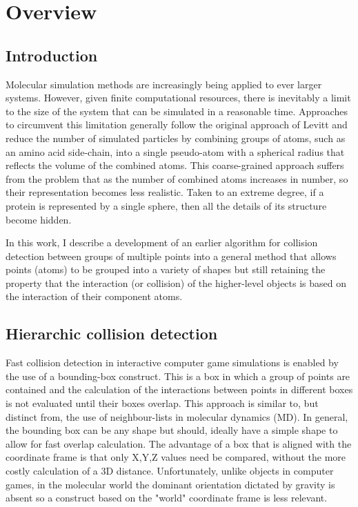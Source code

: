 \section{Overview}

\subsection{Introduction}

Molecular simulation methods are increasingly being applied to ever larger systems.
However, given finite computational resources, there is inevitably a limit to the
size of the system that can be simulated in a reasonable time.   Approaches to 
circumvent this limitation generally follow the original approach of Levitt and
reduce the number of simulated particles by combining groups of atoms, such as an
amino acid side-chain, into a single pseudo-atom with a spherical radius that
reflects the volume of the combined atoms.
This coarse-grained approach suffers from the problem that as the number of combined
atoms increases in number, so their representation becomes less realistic.  Taken
to an extreme degree, if a protein is represented by a single sphere, then all 
the details of its structure become hidden.  

In this work, I describe a development of an earlier algorithm for collision 
detection between groups of multiple points into a general method that allows
points (atoms) to be grouped into a variety of shapes but still retaining the 
property that the interaction (or collision) of the higher-level objects is based
on the interaction of their component atoms.

\subsection{Hierarchic collision detection}

Fast collision detection in interactive computer game simulations is enabled by the
use of a bounding-box construct.  This is a box in which a group of points are contained
and the calculation of the interactions between points in different boxes is not
evaluated until their boxes overlap.    This approach is similar to, but distinct from,
the use of neighbour-lists in molecular dynamics (MD).   In general, the bounding
box can be any shape but should, ideally have a simple shape to allow for fast
overlap calculation.    The advantage of a box that is aligned with the coordinate
frame is that only X,Y,Z values need be compared, without the more costly calculation
of a 3D distance. Unfortunately, unlike objects in computer games, in the molecular
world the dominant orientation dictated by gravity is absent so a construct based
on the "world" coordinate frame is less relevant.

